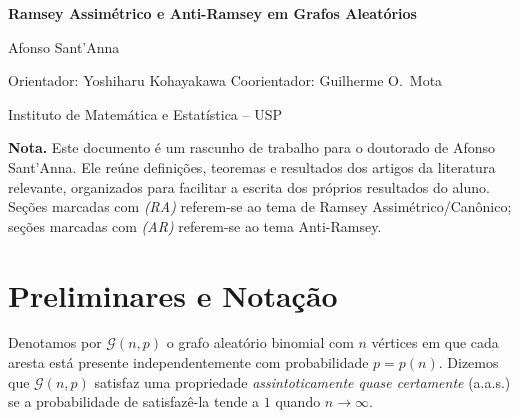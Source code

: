 \documentclass[reqno, 12pt]{amsart}
\date{\today}
\numberwithin{equation}{section}
\theoremstyle{plain}
\theoremstyle{definition}
\newcommand{\Gnp}{\mathcal{G}(n,p)}
\newcommand{\whp}{a.a.s.}
\begin{document}

\begin{center}
  {\large\textbf{Ramsey Assimétrico e Anti-Ramsey em Grafos Aleatórios}}

  \vspace{0.4cm}

  Afonso Sant'Anna

  \vspace{0.2cm}

  {\small Orientador: Yoshiharu Kohayakawa \quad
   Coorientador: Guilherme O.\ Mota}

  \vspace{0.2cm}

  {\small Instituto de Matemática e Estatística -- USP}
\end{center}

\vspace{0.5cm}

\noindent\textbf{Nota.}
Este documento é um rascunho de trabalho para o doutorado de Afonso Sant'Anna.
Ele reúne definições, teoremas e resultados dos artigos da literatura relevante,
organizados para facilitar a escrita dos próprios resultados do aluno.
Seções marcadas com \emph{(RA)} referem-se ao tema de Ramsey Assimétrico/Canônico;
seções marcadas com \emph{(AR)} referem-se ao tema Anti-Ramsey.

\tableofcontents

\bigskip

\section{Preliminares e Notação}

Denotamos por $\Gnp$ o grafo aleatório binomial com $n$ vértices em que cada aresta
está presente independentemente com probabilidade $p = p(n)$.
Dizemos que $\Gnp$ satisfaz uma propriedade \emph{assintoticamente quase certamente}
(\whp) se a probabilidade de satisfazê-la tende a $1$ quando $n \to \infty$.
\end{document}
